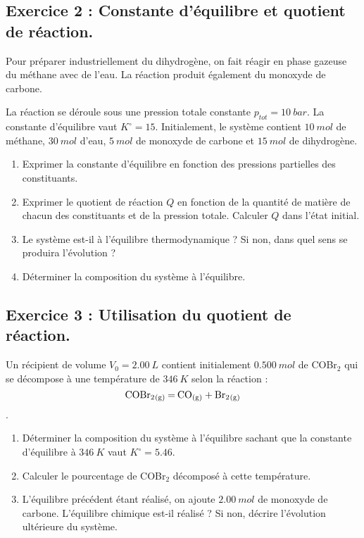 \subsection{Exercice 2 : Constante d'équilibre et quotient de réaction.}

Pour préparer industriellement du dihydrogène, on fait réagir en phase gazeuse du méthane avec de l'eau. La réaction produit également du monoxyde de carbone.

La réaction se déroule sous une pression totale constante $p_{tot} = \SI{10}{bar}$. La constante d'équilibre vaut $K^\circ = 15$. Initialement, le système contient $\SI{10}{mol}$ de méthane, $\SI{30}{mol}$ d'eau, $\SI{5}{mol}$ de monoxyde de carbone et $\SI{15}{mol}$ de dihydrogène. 

\begin{enumerate}
	\item Exprimer la constante d'équilibre en fonction des pressions partielles des constituants.
	\item Exprimer le quotient de réaction $Q$ en fonction de la quantité de matière de chacun des constituants et de la pression totale. Calculer $Q$ dans l'état initial.
	\item Le système est-il à l'équilibre thermodynamique ? Si non, dans quel sens se produira l'évolution ?
	\item Déterminer la composition du système à l'équilibre.
\end{enumerate}

\subsection{Exercice 3 : Utilisation du quotient de réaction.}

Un récipient de volume $V_0 = \SI{2.00}{L}$ contient initialement $\SI{0.500}{mol}$ de COBr$_2$ qui se décompose à une température de $\SI{346}{K}$ selon la réaction : $$\ce{COBr2_{(g)} = CO_{(g)} + Br2_{(g)}}$$.

\begin{enumerate}
	\item Déterminer la composition du système à l'équilibre sachant que la constante d'équilibre à $\SI{346}{K}$ vaut $K^\circ = 5.46$.
	\item Calculer le pourcentage de COBr$_2$ décomposé à cette température.
	\item L'équilibre précédent étant réalisé, on ajoute $\SI{2.00}{mol}$ de monoxyde de carbone. L'équilibre chimique est-il réalisé ? Si non, décrire l'évolution ultérieure du système.
\end{enumerate}